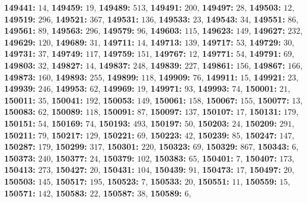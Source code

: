 \textsf{\bfseries 149441:} $14$, \textsf{\bfseries 149459:} $19$, \textsf{\bfseries 149489:} $513$, \textsf{\bfseries 149491:} $200$, \textsf{\bfseries 149497:} $28$, \textsf{\bfseries 149503:} $12$, \textsf{\bfseries 149519:} $296$, \textsf{\bfseries 149521:} $367$, \textsf{\bfseries 149531:} $136$, \textsf{\bfseries 149533:} $23$, \textsf{\bfseries 149543:} $34$, \textsf{\bfseries 149551:} $86$, \textsf{\bfseries 149561:} $89$, \textsf{\bfseries 149563:} $296$, \textsf{\bfseries 149579:} $96$, \textsf{\bfseries 149603:} $115$, \textsf{\bfseries 149623:} $149$, \textsf{\bfseries 149627:} $232$, \textsf{\bfseries 149629:} $120$, \textsf{\bfseries 149689:} $31$, \textsf{\bfseries 149711:} $14$, \textsf{\bfseries 149713:} $139$, \textsf{\bfseries 149717:} $53$, \textsf{\bfseries 149729:} $30$, \textsf{\bfseries 149731:} $37$, \textsf{\bfseries 149749:} $117$, \textsf{\bfseries 149759:} $151$, \textsf{\bfseries 149767:} $12$, \textsf{\bfseries 149771:} $54$, \textsf{\bfseries 149791:} $69$, \textsf{\bfseries 149803:} $32$, \textsf{\bfseries 149827:} $14$, \textsf{\bfseries 149837:} $248$, \textsf{\bfseries 149839:} $227$, \textsf{\bfseries 149861:} $156$, \textsf{\bfseries 149867:} $166$, \textsf{\bfseries 149873:} $160$, \textsf{\bfseries 149893:} $255$, \textsf{\bfseries 149899:} $118$, \textsf{\bfseries 149909:} $76$, \textsf{\bfseries 149911:} $15$, \textsf{\bfseries 149921:} $23$, \textsf{\bfseries 149939:} $246$, \textsf{\bfseries 149953:} $62$, \textsf{\bfseries 149969:} $19$, \textsf{\bfseries 149971:} $93$, \textsf{\bfseries 149993:} $74$, \textsf{\bfseries 150001:} $21$, \textsf{\bfseries 150011:} $35$, \textsf{\bfseries 150041:} $192$, \textsf{\bfseries 150053:} $149$, \textsf{\bfseries 150061:} $158$, \textsf{\bfseries 150067:} $155$, \textsf{\bfseries 150077:} $13$, \textsf{\bfseries 150083:} $62$, \textsf{\bfseries 150089:} $118$, \textsf{\bfseries 150091:} $87$, \textsf{\bfseries 150097:} $137$, \textsf{\bfseries 150107:} $17$, \textsf{\bfseries 150131:} $179$, \textsf{\bfseries 150151:} $54$, \textsf{\bfseries 150169:} $74$, \textsf{\bfseries 150193:} $493$, \textsf{\bfseries 150197:} $50$, \textsf{\bfseries 150203:} $24$, \textsf{\bfseries 150209:} $291$, \textsf{\bfseries 150211:} $79$, \textsf{\bfseries 150217:} $129$, \textsf{\bfseries 150221:} $69$, \textsf{\bfseries 150223:} $42$, \textsf{\bfseries 150239:} $85$, \textsf{\bfseries 150247:} $147$, \textsf{\bfseries 150287:} $179$, \textsf{\bfseries 150299:} $317$, \textsf{\bfseries 150301:} $220$, \textsf{\bfseries 150323:} $69$, \textsf{\bfseries 150329:} $867$, \textsf{\bfseries 150343:} $6$, \textsf{\bfseries 150373:} $240$, \textsf{\bfseries 150377:} $24$, \textsf{\bfseries 150379:} $102$, \textsf{\bfseries 150383:} $65$, \textsf{\bfseries 150401:} $7$, \textsf{\bfseries 150407:} $173$, \textsf{\bfseries 150413:} $273$, \textsf{\bfseries 150427:} $20$, \textsf{\bfseries 150431:} $104$, \textsf{\bfseries 150439:} $91$, \textsf{\bfseries 150473:} $17$, \textsf{\bfseries 150497:} $20$, \textsf{\bfseries 150503:} $145$, \textsf{\bfseries 150517:} $195$, \textsf{\bfseries 150523:} $7$, \textsf{\bfseries 150533:} $20$, \textsf{\bfseries 150551:} $11$, \textsf{\bfseries 150559:} $15$, \textsf{\bfseries 150571:} $142$, \textsf{\bfseries 150583:} $22$, \textsf{\bfseries 150587:} $38$, \textsf{\bfseries 150589:} $6$, 
